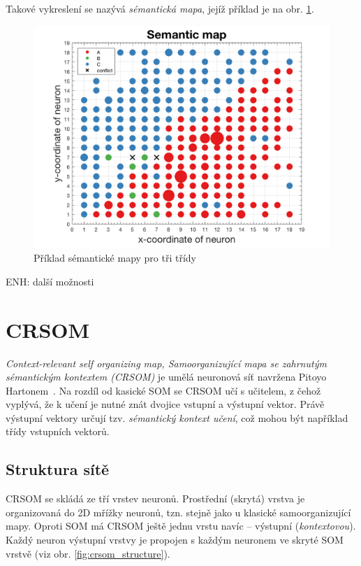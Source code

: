 \documentclass[thesis=M,czech]{FITthesis}[2012/06/26]
\begin{document}
Takové vykreslení se nazývá \textit{sémantická mapa}, jejíž příklad je na obr. \ref{fig:semanticmap}.


\begin{figure}[htbp]
\begin{center}
	\includegraphics[scale=0.3]{exp_sem_map.png}
\caption{Příklad sémantické mapy pro tři třídy}
\label{fig:semanticmap}
\end{center}
\end{figure}


ENH: další možnosti



\section{CRSOM}\label{sec:crsom_teo}
\textit{Context-relevant self organizing map, Samoorganizující mapa se zahrnutým sémantickým kontextem (CRSOM)} je umělá neuronová síť navržena Pitoyo Hartonem~\cite{hartonomain}. Na rozdíl od kasické SOM se CRSOM učí s učitelem, z čehož vyplývá, že k učení je nutné znát dvojice vstupní a výstupní vektor. Právě výstupní vektory určují tzv. \textit{sémantický kontext učení}, což mohou být například třídy vstupních vektorů.

\subsection{Struktura sítě}
CRSOM se skládá ze tří vrstev neuronů. Prostřední (skrytá) vrstva je organizovaná do 2D mřížky neuronů, tzn. stejně jako u klasické samoorganizující mapy.
 Oproti SOM má CRSOM ještě jednu vrstu navíc -- výstupní (\textit{kontextovou}).  Každý neuron výstupní vrstvy je propojen s každým neuronem ve skryté SOM vrstvě (viz obr. \ref{fig:crsom_structure}). 
 
\end{document}
